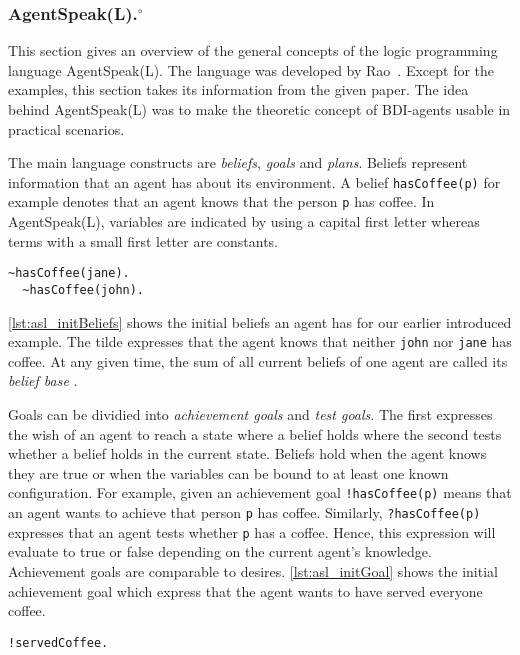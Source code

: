 \subsubsection[AgentSpeak(L).]{AgentSpeak(L).$^\circ$}
This section gives an overview of the general concepts of the logic programming language AgentSpeak(L). The language was developed by Rao~\cite{rao_agentspeak_1996}. Except for the examples, this section takes its information from the given paper. The idea behind AgentSpeak(L) was to make the theoretic concept of BDI-agents usable in practical scenarios. %

The main language constructs are \emph{beliefs}, \emph{goals} and \emph{plans}. Beliefs represent information that an agent has about its environment. A belief \texttt{hasCoffee(p)} for example denotes that an agent knows that the person \texttt{p} has coffee. In AgentSpeak(L), variables are indicated by using a capital first letter whereas terms with a small first letter are constants. %
\begin{lstlisting}[caption={Initial beliefs.}, label=lst:asl_initBeliefs]
  ~hasCoffee(jane).
  ~hasCoffee(john).
\end{lstlisting}
\autoref{lst:asl_initBeliefs} shows the initial beliefs an agent has for our earlier introduced example. The tilde expresses that the agent knows that neither \texttt{john} nor \texttt{jane} has coffee. At any given time, the sum of all current beliefs of one agent are called its \emph{belief base} \cite{bordini_jason_2005}. %

Goals can be dividied into \emph{achievement goals} and \emph{test goals}. The first expresses the wish of an agent to reach a state where a belief holds where the second tests whether a belief holds in the current state. Beliefs hold when the agent knows they are true or when the variables can be bound to at least one known configuration. For example, given an achievement goal \texttt{!hasCoffee(p)} means that an agent wants to achieve that person \texttt{p} has coffee. Similarly, \texttt{?hasCoffee(p)} expresses that an agent tests whether \texttt{p} has a coffee. Hence, this expression will evaluate to true or false depending on the current agent's knowledge.
Achievement goals are comparable to desires. %
\autoref{lst:asl_initGoal} shows the initial achievement goal which express that the agent wants to have served everyone coffee.
\begin{lstlisting}[firstnumber=3, caption={Initial goal.}, label=lst:asl_initGoal]
  !servedCoffee.
\end{lstlisting}

